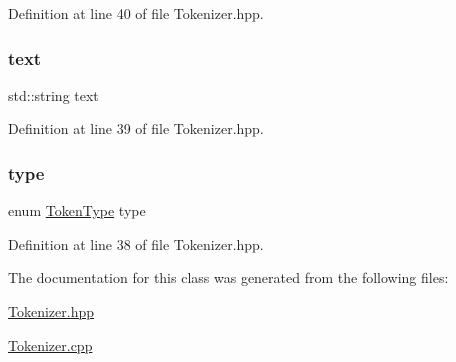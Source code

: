 Definition at line 40 of file Tokenizer.\+hpp.

\mbox{\label{classft_1_1_token_a23c058547fbc73b5659191844a9f258c}} 
\subsubsection{\texorpdfstring{text}{text}}
{\footnotesize\ttfamily std\+::string text}



Definition at line 39 of file Tokenizer.\+hpp.

\mbox{\label{classft_1_1_token_a9ba17ef6e6c544012e04da10a6d461e5}} 
\subsubsection{\texorpdfstring{type}{type}}
{\footnotesize\ttfamily enum \hyperlink{namespaceft_aa520fbf142ba1e7e659590c07da31921}{Token\+Type} type}



Definition at line 38 of file Tokenizer.\+hpp.



The documentation for this class was generated from the following files\+:\begin{DoxyCompactItemize}
\item 
\hyperlink{_tokenizer_8hpp}{Tokenizer.\+hpp}\item 
\hyperlink{_tokenizer_8cpp}{Tokenizer.\+cpp}\end{DoxyCompactItemize}
